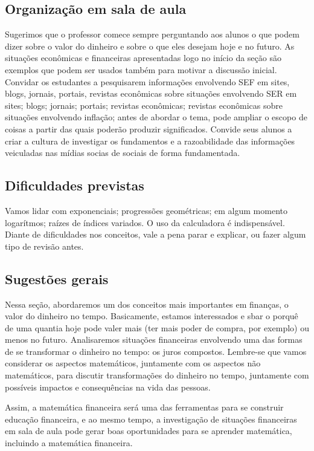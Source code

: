 \begin{paginatexto}
\subsection{Organização em sala de aula} Sugerimos que o professor comece sempre perguntando aos alunos o que podem dizer sobre o valor do dinheiro e sobre o que eles desejam hoje e no futuro. As situações econômicas e financeiras apresentadas logo no início da seção são exemplos que podem ser usados também para motivar a discussão inicial. Convidar os estudantes a pesquisarem informações envolvendo SEF em sites, blogs, jornais, portais, revistas econômicas sobre situações envolvendo SER em sites; blogs; jornais; portais; revistas econômicas; revistas econômicas sobre situações envolvendo inflação; antes de abordar o tema, pode ampliar o escopo de coisas a partir das quais poderão produzir significados. Convide seus alunos a criar a cultura de investigar os fundamentos e a razoabilidade das informações veiculadas nas mídias socias de sociais de forma fundamentada.

\subsection{Dificuldades previstas} Vamos lidar com exponenciais; progressões geométricas; em algum momento logarítmos; raízes de índices variados. O uso da calculadora é indispensável. Diante de dificuldades nos conceitos, vale a pena parar e explicar, ou fazer algum tipo de revisão antes.

\subsection{Sugestões gerais} Nessa seção, abordaremos um dos conceitos mais importantes em finanças, o valor do dinheiro no tempo. Basicamente, estamos interessados e sbar o porquê de uma quantia hoje pode valer mais (ter mais poder de compra, por exemplo) ou menos no futuro. Analisaremos situações financeiras envolvendo uma das formas de se transformar o dinheiro no tempo: os juros compostos. Lembre-se que vamos considerar os aspectos matemáticos, juntamente com os aspectos não matemáticos, para discutir transformações do dinheiro no tempo, juntamente com possíveis impactos e consequências na vida das pessoas.

Assim, a matemática financeira será uma das ferramentas para se construir educação financeira, e ao mesmo tempo, a investigação de situações financeiras em sala de aula pode gerar boas oportunidades para se aprender matemática, incluindo a matemática financeira.


\end{paginatexto}
